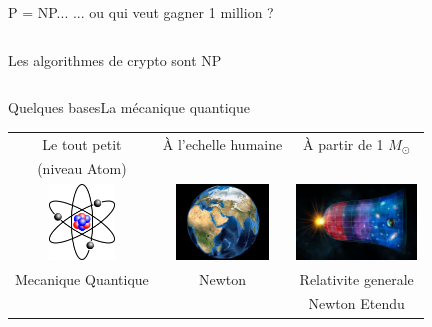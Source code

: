 \documentclass{beamer}
\begin{document}
\begin{frame}{P = NP... }{... ou qui veut gagner 1 million ?}
  \begin{columns}
    \begin{column}{0.5\textwidth}
      Les algorithmes de crypto sont NP
    \end{column}
    
    \begin{column}{0.5\textwidth}
    \end{column}
  \end{columns}
\end{frame}

\begin{frame}{Quelques bases}{La m\'{e}canique quantique}
  \begin{center}
    \begin{tabular}{ c c c }
      Le tout petit & \`{A} l'echelle humaine  & \`{A} partir de 1 \(M_\odot\) \\
      (niveau Atom) & & \\
      \includegraphics[height=2cm]{Atome_lithium_rutherford.png} & \includegraphics[height=2cm]{TerreWorldWind.jpg} & \includegraphics[height=2cm]{04-965413833409_COI.jpeg}\\
      Mecanique Quantique & Newton & Relativite generale \\
       &  & Newton Etendu \\
    \end{tabular}
  \end{center}
\end{frame}
\end{document}
